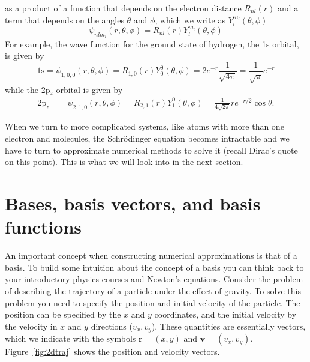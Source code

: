 \documentclass[../Main/chem371-notes.tex]{subfiles}
\begin{document}
 as a product of a function that depends on the electron distance $R_{nl}(r)$ and a term that depends on the angles $\theta$ and $\phi$, which we write as $Y_l^{m_l}(\theta,\phi)$
\begin{equation}
\psi_{nlm_l}(r,\theta,\phi) = R_{nl}(r) Y_l^{m_l}(\theta,\phi)
\end{equation}
For example, the wave function for the  ground state of hydrogen, the 1s orbital, is given by
\begin{equation}
\mathrm{1s} = \psi_{1,0,0}(r,\theta,\phi) = R_{1,0}(r) Y_0^0(\theta,\phi) = 2 e^{-r} \frac{1}{\sqrt{4\pi}} = \frac{1}{\sqrt{\pi}} e^{-r}
\end{equation}
while the 2p$_{z}$ orbital is given by
\begin{align}
\mathrm{2p}_{z} &= \psi_{2,1,0}(r,\theta,\phi) = R_{2,1}(r) Y_1^{0}(\theta,\phi) =
\frac{1}{4\sqrt{2 \pi}}   r e^{-r/2} \cos \theta.
\end{align}

When we turn to more complicated systems, like atoms with more than one electron and molecules, the Schr\"{o}dinger equation becomes intractable and we have to turn to approximate numerical methods to solve it (recall Dirac's quote on this point).
This is what we will look into in the next section.

\section{Bases, basis vectors, and basis functions}


An important concept when constructing numerical approximations is that of a basis.
To build some intuition about the concept of a basis you can think back to your introductory physics courses and Newton's equations.
Consider the problem of describing the trajectory of a particle under the effect of gravity.
To solve this problem you need to specify the position and initial velocity of the particle.
The position can be specified by the $x$ and $y$ coordinates, and the initial velocity by the velocity in $x$ and $y$ directions ($v_x, v_y$).
These quantities are essentially vectors, which we indicate with the symbols $\mathbf{r} = (x,y)$ and $\mathbf{v} = (v_x,v_y)$.
Figure~\ref{fig:2dtraj} shows the position and velocity vectors.
\end{document}
